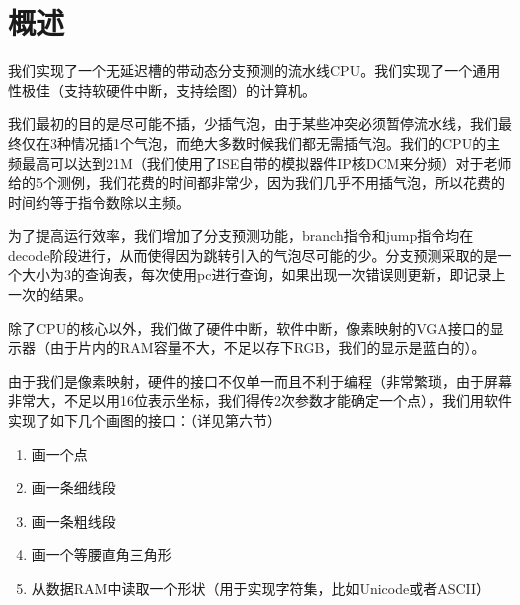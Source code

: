 \section{概述}

我们实现了一个无延迟槽的带动态分支预测的流水线CPU。我们实现了一个通用性极佳（支持软硬件中断，支持绘图）的计算机。

我们最初的目的是尽可能不插，少插气泡，由于某些冲突必须暂停流水线，我们最终仅在3种情况插1个气泡，而绝大多数时候我们都无需插气泡。我们的CPU的主频最高可以达到21M（我们使用了ISE自带的模拟器件IP核DCM来分频）对于老师给的5个测例，我们花费的时间都非常少，因为我们几乎不用插气泡，所以花费的时间约等于指令数除以主频。

为了提高运行效率，我们增加了分支预测功能，branch指令和jump指令均在decode阶段进行，从而使得因为跳转引入的气泡尽可能的少。分支预测采取的是一个大小为3的查询表，每次使用pc进行查询，如果出现一次错误则更新，即记录上一次的结果。

除了CPU的核心以外，我们做了硬件中断，软件中断，像素映射的VGA接口的显示器（由于片内的RAM容量不大，不足以存下RGB，我们的显示是蓝白的）。

由于我们是像素映射，硬件的接口不仅单一而且不利于编程（非常繁琐，由于屏幕非常大，不足以用16位表示坐标，我们得传2次参数才能确定一个点），我们用软件实现了如下几个画图的接口：（详见第六节）

\begin{enumerate}
    \item 画一个点
    \item 画一条细线段
    \item 画一条粗线段
    \item 画一个等腰直角三角形
    \item 从数据RAM中读取一个形状（用于实现字符集，比如Unicode或者ASCII）
\end{enumerate}
